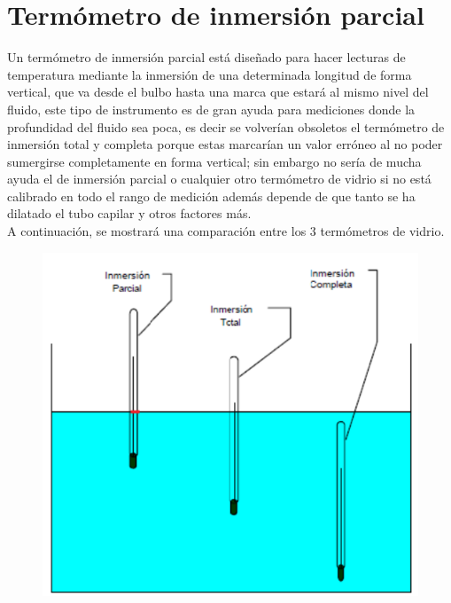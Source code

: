 \documentclass[a4paper,11pt]{report}
\begin{document}
\section{Termómetro de inmersión parcial}
Un termómetro de inmersión parcial está diseñado para hacer lecturas de temperatura mediante la inmersión de una determinada longitud de forma vertical, que va desde el bulbo hasta una marca que estará al mismo nivel del fluido, este tipo de instrumento es de gran ayuda para mediciones donde la profundidad del fluido sea poca, es decir se volverían obsoletos el termómetro de inmersión total y completa porque estas marcarían un valor erróneo al no poder sumergirse completamente en forma vertical; sin embargo no sería de mucha ayuda el de inmersión parcial o cualquier otro termómetro de vidrio si no está calibrado en todo el rango de medición además depende de que tanto se ha dilatado el tubo capilar y otros factores más.\\
A continuación, se mostrará una comparación entre los 3 termómetros de vidrio.
\begin{figure}[H]
\begin{center}
\includegraphics[scale=0.4]{parcial1.png}
\end{center}
\end{figure}
\end{document}
